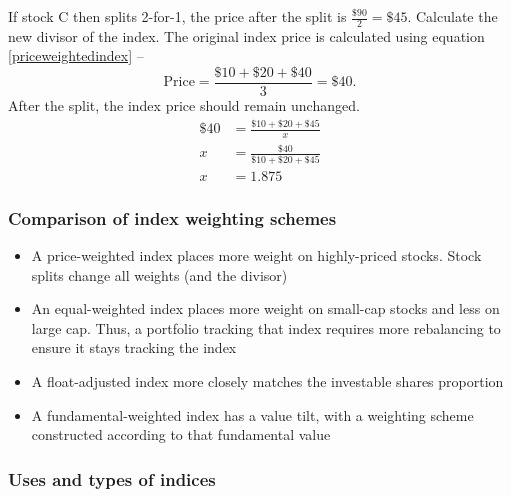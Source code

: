 \documentclass[../notes_compiled.tex]{subfiles}
\begin{document}
\begin{itemize}
{If stock C then splits 2-for-1, the price after the split is $\frac{\$90}{2}=\$45$. Calculate the new divisor of the index.
}
{\color{RoyalBlue}
The original index price is calculated using equation \ref{priceweightedindex} -- 
\begin{equation}
\text{Price} = \frac{\$10 + \$20 + \$40}{3} = \$40.
\end{equation}
After the split, the index price should remain unchanged.
\begin{align*}
\$40 &= \frac{\$10 + \$20 + \$45}{x}  \\
x &= \frac{\$40}{\$10 + \$20 + \$45} \\
x &= 1.875
\end{align*}
}
\end{itemize}




\subsubsection{Comparison of index weighting schemes}
\begin{itemize}
\item A price-weighted index places more weight on highly-priced stocks. Stock splits change all weights (and the divisor)
\item An equal-weighted index places more weight on small-cap stocks and less on large cap. Thus, a portfolio tracking that index requires more rebalancing to ensure it stays tracking the index
\item A float-adjusted index more closely matches the investable shares proportion
\item A fundamental-weighted index has a value tilt, with a weighting scheme constructed according to that fundamental value
\end{itemize}

\subsubsection{Uses and types of indices}
\end{document}
